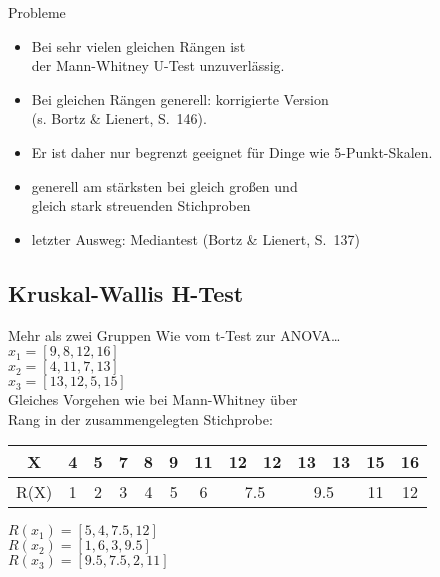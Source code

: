 \begin{frame}
  {Probleme}
  \begin{itemize}[<+->]
    \item Bei sehr vielen gleichen Rängen ist\\
      der Mann-Whitney U-Test unzuverlässig.
    \item Bei gleichen Rängen generell: korrigierte Version\\
      (s. Bortz \& Lienert, S.\ 146).
      \Zeile
    \item Er ist daher nur begrenzt geeignet für Dinge wie 5-Punkt-Skalen.
    \item generell am stärksten bei gleich großen und\\
      gleich stark streuenden Stichproben
      \Zeile
    \item letzter Ausweg: \alert{Mediantest} (Bortz \& Lienert, S.\ 137)
  \end{itemize}
\end{frame}

\subsection{Kruskal-Wallis H-Test}

\begin{frame}
  {Mehr als zwei Gruppen}
  Wie vom t-Test zur ANOVA\ldots\\
  $x_1=[9,8,12,16]$\\
  $x_2=[4,11,7,13]$\\
  $x_3=[13,12,5,15]$\\[2ex]
  \pause
  Gleiches Vorgehen wie bei Mann-Whitney über\\
  \alert{Rang in der zusammengelegten Stichprobe}:\\
  \begin{center}
    \begin{tabular}[h!]{|c||c|c|c|c|c|c|c|c|c|c|c|c|}
      \hline
      X    & 4 & 5 & 7 & 8 & 9 & 11 & 12 & 12 & 13 & 13 & 15 & 16 \\
      \hline
      R(X) & 1 & 2 & 3 & 4 & 5 & 6 & \multicolumn{2}{c|}{7.5} & \multicolumn{2}{c|}{9.5} & 11 & 12 \\
      \hline
    \end{tabular}
  \end{center}
  \pause
  $R(x_1)=[5,4,7.5,12]$\\
  $R(x_2)=[1,6,3,9.5]$\\
  $R(x_3)=[9.5,7.5,2,11]$\\
\end{frame}

